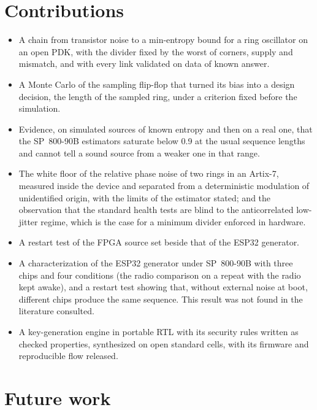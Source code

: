 \section{Contributions}

\begin{itemize}
\item A chain from transistor noise to a min-entropy bound for a ring
oscillator on an open \ac{PDK}, with the divider fixed by the worst of
corners, supply and mismatch, and with every link validated on data of
known answer.
\item A Monte Carlo of the sampling flip-flop that turned its bias into a
design decision, the length of the sampled ring, under a criterion fixed
before the simulation.
\item Evidence, on simulated sources of known entropy and then on a real
one, that the SP~800-90B estimators saturate below 0.9 at the usual
sequence lengths and cannot tell a sound source from a weaker one in that
range.
\item The white floor of the relative phase noise of two rings in an
Artix-7, measured inside the device and separated from a deterministic
modulation of unidentified origin, with the limits of the
estimator stated; and the observation that the standard health tests are
blind to the anticorrelated low-jitter regime, which is the case for a
minimum divider enforced in hardware.
\item A restart test of the \ac{FPGA} source set beside that of the ESP32
generator.
\item A characterization of the ESP32 generator under SP~800-90B with
three chips and four conditions (the radio comparison on a repeat with
the radio kept awake), and a restart test showing that, without
external noise at boot, different chips produce the same sequence. This
result was not found in the literature consulted.
\item A key-generation engine in portable RTL with its security rules
written as checked properties, synthesized on open standard cells, with
its firmware and reproducible flow released.
\end{itemize}

\section{Future work}

